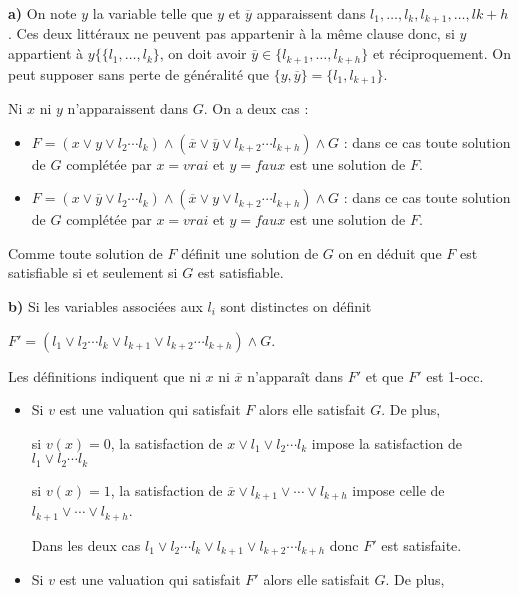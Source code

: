 \begin{Answer}{\bf a)} 
On note $y$ la variable telle que $y$ et $\overline y$ apparaissent dans $l_1,\ldots,l_k,l_{k+1},\ldots,l{k+h}$. 
Ces deux littéraux ne peuvent pas appartenir à la même clause donc, si $y$ appartient à  $y\{\{l_1,\ldots,l_{k}\}$, on doit avoir $\overline y\in \{l_{k+1},\ldots,l_{k+h}\}$ et réciproquement. On peut supposer sans perte de généralité que $\{y,\overline y\} = \{l_1,l_{k+1}\}$.

Ni $x$ ni $y$ n'apparaissent dans $G$. On a deux cas :

\begin{itemize}
  \item $F = (x\lor y \lor l_2 \cdots l_k) \land (\overline x\lor \overline y \lor l_{k+2} \cdots l_{k+h})\land G $ : dans ce cas toute solution de $G$ complétée  par $x= vrai$ et $y = faux$ est une solution de $F$.
  \item $F = (x\lor \overline y \lor l_2 \cdots l_k) \land (\overline x\lor y \lor l_{k+2} \cdots l_{k+h})\land G $ : dans ce cas toute solution de $G$ complétée par $x= vrai$ et $y = faux$ est une solution de $F$.
\end{itemize}

Comme toute solution de $F$ définit une solution de $G$ on en déduit que $F$ est satisfiable si et seulement si $G$ est satisfiable.

\medskip

{\bf b)} Si les variables associées aux $l_i$ sont distinctes on définit

$F' = (l_1 \lor l_2 \cdots l_k \lor l_{k+1} \lor l_{k+2} \cdots l_{k+h})\land G $.

Les définitions indiquent que ni $x$ ni $\overline x$ n'apparaît dans $F'$ et que $F'$ est 1-occ.

\begin{itemize}
  \item Si $v$ est une valuation qui satisfait $F$ alors elle satisfait $G$. De plus, 
  
 si $v(x) = 0$, la satisfaction de $x \lor l_1 \lor l_2 \cdots l_k$ impose la satisfaction de $l_1 \lor l_2 \cdots l_k$
 
  si $v(x)=1$, la satisfaction de $\overline x\lor l_{k+1} \lor  \cdots  \lor l_{k+h}$ impose celle de 
  $l_{k+1} \lor \cdots \lor l_{k+h}$.
  
  Dans les deux cas $l_1 \lor l_2 \cdots l_k \lor l_{k+1} \lor l_{k+2} \cdots l_{k+h}$ donc $F'$ est satisfaite.
  
  \item Si $v$ est une valuation qui satisfait $F'$ alors elle satisfait $G$. De plus, 
  

\end{itemize}
\end{Answer}
